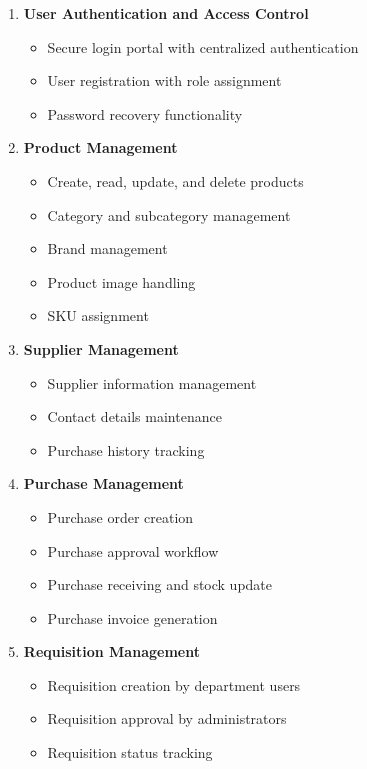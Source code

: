 \begin{enumerate}
    \item \textbf{User Authentication and Access Control}
    \begin{itemize}
        \item Secure login portal with centralized authentication
        \item User registration with role assignment
        \item Password recovery functionality
    \end{itemize}

    \item \textbf{Product Management}
    \begin{itemize}
        \item Create, read, update, and delete products
        \item Category and subcategory management
        \item Brand management
        \item Product image handling
        \item SKU assignment
    \end{itemize}

    \item \textbf{Supplier Management}
    \begin{itemize}
        \item Supplier information management
        \item Contact details maintenance
        \item Purchase history tracking
    \end{itemize}

    \item \textbf{Purchase Management}
    \begin{itemize}
        \item Purchase order creation
        \item Purchase approval workflow
        \item Purchase receiving and stock update
        \item Purchase invoice generation
    \end{itemize}

    \item \textbf{Requisition Management}
    \begin{itemize}
        \item Requisition creation by department users
        \item Requisition approval by administrators
        \item Requisition status tracking
    \end{itemize}


\end{enumerate}

